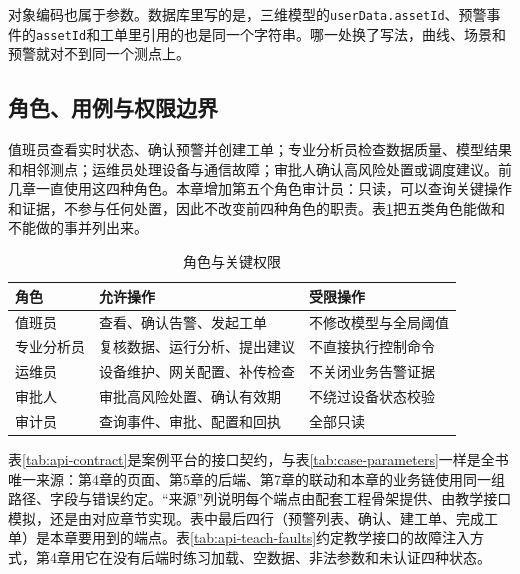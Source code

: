 对象编码也属于参数。数据库里写的是\texttt{\cpKeyStation}，三维模型的\texttt{userData.assetId}、预警事件的\texttt{assetId}和工单里引用的也是同一个字符串。哪一处换了写法，曲线、场景和预警就对不到同一个测点上。

\subsection{角色、用例与权限边界}

值班员查看实时状态、确认预警并创建工单；专业分析员检查数据质量、模型结果和相邻测点；运维员处理设备与通信故障；审批人确认高风险处置或调度建议。前几章一直使用这四种角色。本章增加第五个角色审计员：只读，可以查询关键操作和证据，不参与任何处置，因此不改变前四种角色的职责。表\ref{tab:case-roles}把五类角色能做和不能做的事并列出来。

\begin{table}[htbp]
\centering
\caption{角色与关键权限}
\label{tab:case-roles}
\begin{tabular}{p{2.3cm}p{4.8cm}p{5.2cm}}
\toprule
角色 & 允许操作 & 受限操作 \\
\midrule
值班员 & 查看、确认告警、发起工单 & 不修改模型与全局阈值 \\
专业分析员 & 复核数据、运行分析、提出建议 & 不直接执行控制命令 \\
运维员 & 设备维护、网关配置、补传检查 & 不关闭业务告警证据 \\
审批人 & 审批高风险处置、确认有效期 & 不绕过设备状态校验 \\
审计员 & 查询事件、审批、配置和回执 & 全部只读 \\
\bottomrule
\end{tabular}
\end{table}

表\ref{tab:api-contract}是案例平台的接口契约，与表\ref{tab:case-parameters}一样是全书唯一来源：第4章的页面、第5章的后端、第7章的联动和本章的业务链使用同一组路径、字段与错误约定。“来源”列说明每个端点由配套工程骨架提供、由教学接口模拟，还是由对应章节实现。表中最后四行（预警列表、确认、建工单、完成工单）是本章要用到的端点。表\ref{tab:api-teach-faults}约定教学接口的故障注入方式，第4章用它在没有后端时练习加载、空数据、非法参数和未认证四种状态。

